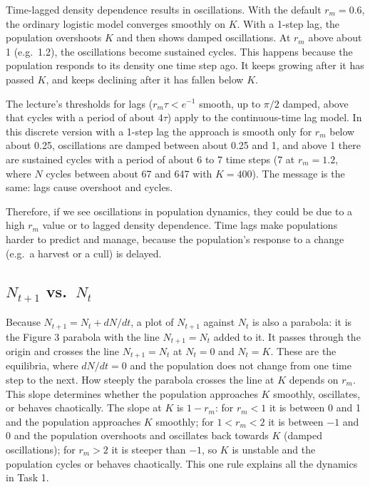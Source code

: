 \documentclass[
  a4paper]{book}
\begin{document}
Time-lagged density dependence results in oscillations. With the default \(r_m = 0.6\), the ordinary logistic model converges smoothly on \(K\). With a 1-step lag, the population overshoots \(K\) and then shows damped oscillations. At \(r_m\) above about 1 (e.g.~1.2), the oscillations become sustained cycles. This happens because the population responds to its density one time step ago. It keeps growing after it has passed \(K\), and keeps declining after it has fallen below \(K\).

The lecture's thresholds for lags (\(r_m\tau < e^{-1}\) smooth, up to \(\pi/2\) damped, above that cycles with a period of about \(4\tau\)) apply to the continuous-time lag model. In this discrete version with a 1-step lag the approach is smooth only for \(r_m\) below about 0.25, oscillations are damped between about 0.25 and 1, and above 1 there are sustained cycles with a period of about 6 to 7 time steps (7 at \(r_m = 1.2\), where \(N\) cycles between about 67 and 647 with \(K = 400\)). The message is the same: lags cause overshoot and cycles.

Therefore, if we see oscillations in population dynamics, they could be due to a high \(r_m\) value or to lagged density dependence. Time lags make populations harder to predict and manage, because the population's response to a change (e.g.~a harvest or a cull) is delayed.

\subsection{\texorpdfstring{\(N_{t+1}\) vs.~\(N_t\)}{N\_\{t+1\} vs.~N\_t}}\label{n_t1-vs.-n_t}

Because \(N_{t+1} = N_t + dN/dt\), a plot of \(N_{t+1}\) against \(N_t\) is also a parabola: it is the Figure 3 parabola with the line \(N_{t+1} = N_t\) added to it. It passes through the origin and crosses the line \(N_{t+1} = N_t\) at \(N_t = 0\) and \(N_t = K\). These are the equilibria, where \(dN/dt = 0\) and the population does not change from one time step to the next. How steeply the parabola crosses the line at \(K\) depends on \(r_m\). This slope determines whether the population approaches \(K\) smoothly, oscillates, or behaves chaotically. The slope at \(K\) is \(1 - r_m\): for \(r_m < 1\) it is between 0 and 1 and the population approaches \(K\) smoothly; for \(1 < r_m < 2\) it is between \(-1\) and 0 and the population overshoots and oscillates back towards \(K\) (damped oscillations); for \(r_m > 2\) it is steeper than \(-1\), so \(K\) is unstable and the population cycles or behaves chaotically. This one rule explains all the dynamics in Task 1.
\end{document}
